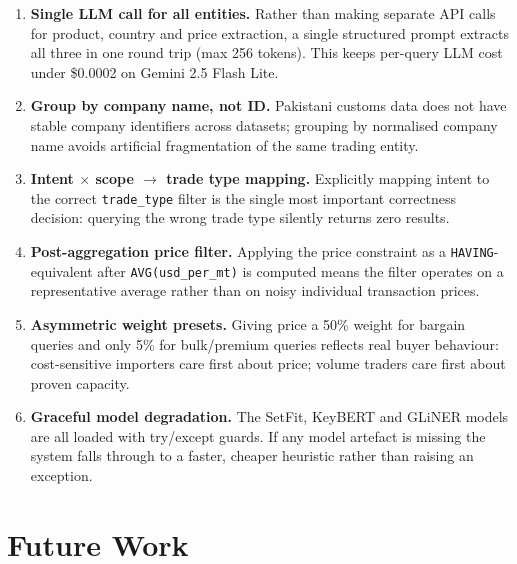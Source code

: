 \documentclass[12pt,a4paper]{article}
\begin{document}
\begin{enumerate}
  \item \textbf{Single LLM call for all entities.}
        Rather than making separate API calls for product, country and price extraction,
        a single structured prompt extracts all three in one round trip (max 256 tokens).
        This keeps per-query LLM cost under \$0.0002 on Gemini 2.5 Flash Lite.

  \item \textbf{Group by company name, not ID.}
        Pakistani customs data does not have stable company identifiers across datasets;
        grouping by normalised company name avoids artificial fragmentation of the same
        trading entity.

  \item \textbf{Intent $\times$ scope $\rightarrow$ trade type mapping.}
        Explicitly mapping intent to the correct \texttt{trade\_type} filter is the
        single most important correctness decision: querying the wrong trade type
        silently returns zero results.

  \item \textbf{Post-aggregation price filter.}
        Applying the price constraint as a \texttt{HAVING}-equivalent after
        \texttt{AVG(usd\_per\_mt)} is computed means the filter operates on a
        representative average rather than on noisy individual transaction prices.

  \item \textbf{Asymmetric weight presets.}
        Giving price a 50\% weight for bargain queries and only 5\% for bulk/premium
        queries reflects real buyer behaviour: cost-sensitive importers care first about
        price; volume traders care first about proven capacity.

  \item \textbf{Graceful model degradation.}
        The SetFit, KeyBERT and GLiNER models are all loaded with try/except guards.
        If any model artefact is missing the system falls through to a faster, cheaper
        heuristic rather than raising an exception.
\end{enumerate}

\section{Future Work}
\label{sec:future}
\end{document}

